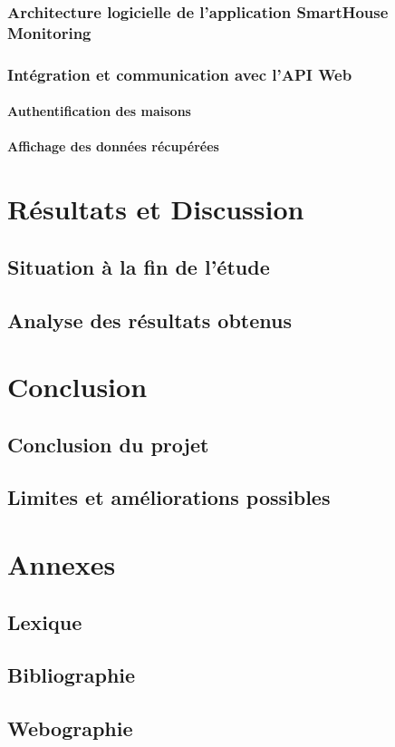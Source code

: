 \documentclass[10pt, a4paper]{report}
\begin{document}
	\subsection{Architecture logicielle de l'application SmartHouse Monitoring}
	\subsection{Intégration et communication avec l'API Web}
	\subsubsection{Authentification des maisons}
	\subsubsection{Affichage des données récupérées}
	
	\chapter{Résultats et Discussion}
	\section{Situation à la fin de l’étude}
	\section{Analyse des résultats obtenus}
	
	\chapter{Conclusion}
	\section{Conclusion du projet}
	\section{Limites et améliorations possibles}
	
	\appendix
	\chapter{Annexes}
	\section{Lexique}
	\section{Bibliographie}
	\section{Webographie}
	
	
	
		
	
	\nocite{*}
	
	
	
	\clearpage
	
	\printglossaries
	
	
\end{document}
